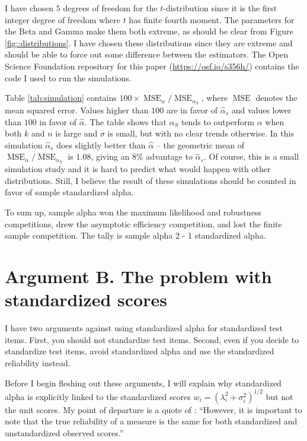 \documentclass[twoside]{article}
\DeclareMathOperator{\MSE}{MSE}
\begin{document}
I have chosen $5$ degrees of freedom for the $t$-distribution since it is the first integer degree of freedom where $t$ has finite fourth moment. The parameters for the Beta and Gamma make them both extreme, as should be clear from Figure \ref{fig::distributions}. I have chosen these distributions since they are extreme and should be able to force out some difference between the estimators. The Open Science Foundation repository for this paper (\url{https://osf.io/s356h/}) contains the code I used to run the simulations.

Table \ref{tab:simulation} contains $100 \times \MSE_\alpha/\MSE_{\alpha_S}$, where $\MSE$ denotes the mean squared error. Values higher than $100$ are in favor of $\hat{\alpha}_s$ and values lower than $100$ in favor of $\hat{\alpha}$. The table shows that $\alpha_S$ tends to outperform $\alpha$ when both $k$ and $n$ is large and $\sigma$ is small, but with no clear trends otherwise. In this simulation $\hat{\alpha}_s$ does slightly better than $\hat{\alpha}$ -- the geometric mean of $\MSE_\alpha/\MSE_{\alpha_S}$ is $1.08$, giving an $8$\% advantage to $\hat{\alpha}_s$. Of course, this is a small simulation study and it is hard to predict what would happen with other distributions. Still, I believe the result of these simulations should be counted in favor of sample standardized alpha.

To sum up, sample alpha won the maximum likelihood and robustness competitions, drew the asymptotic efficiency competition, and lost the finite sample competition. The tally is sample alpha 2 - 1 standardized alpha. 



\section{Argument B. The problem with standardized scores}
\label{sec:argument B}
I have two arguments against using standardized alpha for standardized
test items. First, you should not standardize test items. Second,
even if you decide to standardize test items, avoid standardized
alpha and use the standardized reliability instead.

Before I begin fleshing out these arguments, I will explain why standardized alpha is explicitly linked to the standardized scores $w_i = {(\lambda_i^2 + \sigma_i^2)}^{1/2}$  but not the unit scores. My point of departure is a quote of \citet[][p.348]{Osburn2000-jd}: 
\enquote{However, it is important to note that the true reliability of a measure is the same for both standardized and unstandardized observed scores.}
\end{document}
